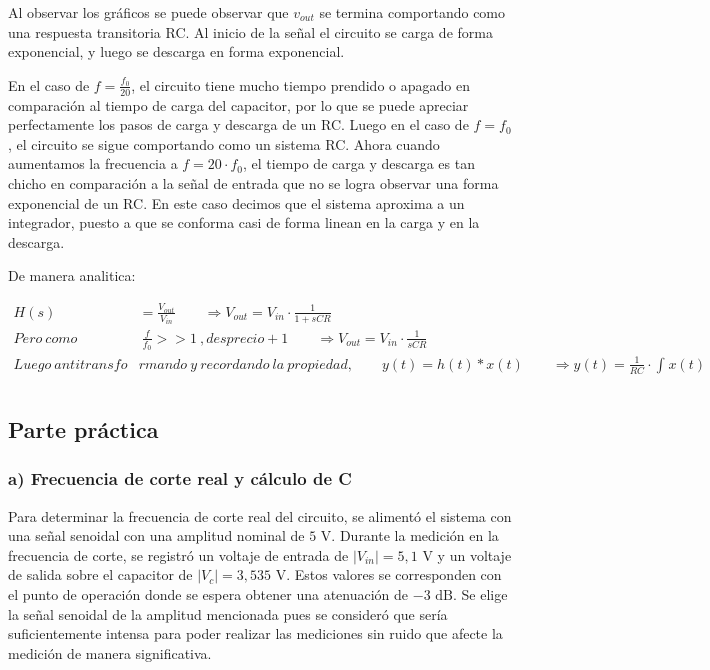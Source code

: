 \documentclass{article}
\begin{document}
Al observar los gráficos se puede observar que $v_{out}$ se termina comportando como una respuesta transitoria RC. Al inicio de la señal el circuito se carga de forma exponencial, y luego se descarga en forma exponencial. \par

En el caso de $f=\frac{f_0}{20}$, el circuito tiene mucho tiempo prendido o apagado en comparación al tiempo de carga del capacitor, por lo que se puede apreciar perfectamente los pasos de carga y descarga de un RC. Luego en el caso de $f=f_0$, el circuito se sigue comportando como un sistema RC. Ahora cuando aumentamos la frecuencia a $f=20\cdot f_0$, el tiempo de carga y descarga es tan chicho en comparación a la señal de entrada que no se logra observar una forma exponencial de un RC. En este caso decimos que el sistema aproxima a un integrador, puesto a que se conforma casi de forma linean en la carga y en la descarga.

De manera analitica:

\begin{align*}
    H(s) &= \frac{V_{out}}{V_{in}}      \qquad    \Rightarrow V_{out}=V_{in} \cdot \frac{1}{1+sCR}\\
    Pero\ como &\ \frac{f}{f_0}>> 1\ ,desprecio +1       \qquad     \Rightarrow V_{out}=V_{in} \cdot \frac{1}{sCR}\\
    Luego\ antitransfo&rmando\ y\ recordando\ la\ propiedad,         \qquad      y(t)=h(t) * x(t)       \qquad      \Rightarrow y(t)=\frac{1}{RC} \cdot \int_{}^{}x(t)\\
\end{align*}



    \subsection{Parte práctica}
                        \subsubsection*{a) Frecuencia de corte real y cálculo de C}
        
                    Para determinar la frecuencia de corte real del circuito, se alimentó el sistema
                     con una señal senoidal con una amplitud nominal de $5\text{ V}$. Durante
                      la medición en la frecuencia de corte, se registró un voltaje de entrada
                       de $|V_{in}| = 5,1\text{ V}$ y un voltaje de salida sobre el capacitor 
                       de $|V_c| = 3,535\text{ V}$. Estos valores se corresponden con el punto 
                       de operación donde se espera obtener una atenuación de $-3\text{ dB}$.
                    Se elige la señal senoidal de la amplitud mencionada pues se consideró que 
                    sería suficientemente intensa para poder realizar las mediciones sin ruido
                     que afecte la medición de manera significativa.
        
\end{document}
